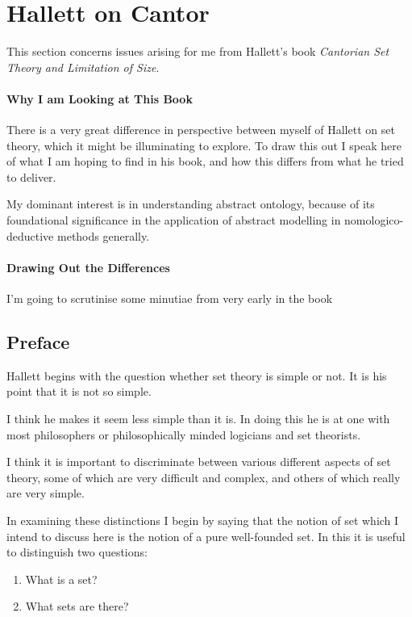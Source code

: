 
\section{Hallett on Cantor}

This section concerns issues arising for me from Hallett's book \emph{Cantorian Set Theory and Limitation of Size}\cite{hallettCSTALS}.

\paragraph{Why I am Looking at This Book}

There is a very great difference in perspective between myself of Hallett on set theory, which it might be illuminating to explore.
To draw this out I speak here of what I am hoping to find in his book, and how this differs from what he tried to deliver.

My dominant interest is in understanding abstract ontology, because of its foundational significance in the application of abstract modelling in nomologico-deductive methods generally.

\paragraph{Drawing Out the Differences}

I'm going to scrutinise some minutiae from very early in the book

\subsection{Preface}

Hallett begins with the question whether set theory is simple or not.
It is his point that it is not so simple.

I think he makes it seem less simple than it is.
In doing this he is at one with most philosophers or philosophically minded logicians and set theorists.

I think it is important to discriminate between various different aspects of set theory, some of which are very difficult and complex, and others of which really are very simple.

In examining these distinctions I begin by saying that the notion of set which I intend to discuss here is the notion of a pure well-founded set.
In this it is useful to distinguish two questions:
\begin{enumerate}
\item What is a set?
\item What sets are there?
\end{enumerate}

